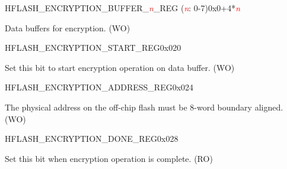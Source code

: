 \begin{register}{H}{FLASH\_ENCRYPTION\_BUFFER\_\textcolor{red}{\it{n}}\_REG (\textcolor{red}{\it{n}}: 0-7)}{0x0+4*\textcolor{red}{\it{n}}}\label{regdesc:FLASHENCRYPTIONBUFFERnREG}
%
\regnewline%
\begin{regdesc}\begin{reglist}
\item [FLASH\_ENCRYPTION\_BUFFER\_\textcolor{red}{\it{n}}\_REG] Data buffers for encryption. (WO)
\end{reglist}\end{regdesc}
\end{register}


\begin{register}{H}{FLASH\_ENCRYPTION\_START\_REG}{0x020}\label{regdesc:FLASHENCRYPTIONSTARTREG}
%
%
\regnewline%
\begin{regdesc}\begin{reglist}
\item [FLASH\_START] Set this bit to start encryption operation on data buffer. (WO)
\end{reglist}\end{regdesc}
\end{register}


\begin{register}{H}{FLASH\_ENCRYPTION\_ADDRESS\_REG}{0x024}\label{regdesc:FLASHENCRYPTIONADDRESSREG}
%
\regnewline%
\begin{regdesc}\begin{reglist}
\item [FLASH\_ENCRYPTION\_ADDRESS\_REG] The physical address on the off-chip flash must be 8-word boundary aligned. (WO)
\end{reglist}\end{regdesc}
\end{register}


\begin{register}{H}{FLASH\_ENCRYPTION\_DONE\_REG}{0x028}\label{regdesc:FLASHENCRYPTIONDONEREG}
%
%
\regnewline%
\begin{regdesc}\begin{reglist}
\item [FLASH\_DONE] Set this bit when encryption operation is complete. (RO)
\end{reglist}\end{regdesc}
\end{register}

